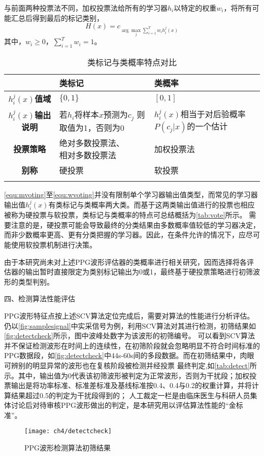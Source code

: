 与前面两种投票法不同，加权投票法给所有的学习器$h_i$以特定的权重$w_i$，将所有可能汇总后得到最后的标记类别，
\begin{equation}
    \label{equ:wvoting}
    H(x)=c_{\arg \max\limits_{j} \sum_{i=1}^T{w_ih_i^j(x)}}
\end{equation}
其中，$w_i\ge0$，$\sum_{i=1}^T{w_i=1}$。
\begin{table}[htbp]
    \centering
    \caption{\label{tab:vote}类标记与类概率特点对比}
    \begin{tabularx}{\linewidth}{c|X<{\centering}X<{\centering}}
        \Xhline{1pt} 
            &\textbf{类标记}&\textbf{类概率}\\
        \hline
        \textbf{$h_i^j(x)$值域}  &$\{0,1\}$    &$[0,1]$     \\
        \textbf{$h_i^j(x)$输出说明}&\tabincell{c}{若$h_i$将样本$x$预测为$c_j$\\则取值为1，否则为0}&\tabincell{c}{$h_i^j(x)$相当于对后验概率\\$P(c_j|x)$的一个估计}\\
        \textbf{投票策略}&\tabincell{c}{绝对多数投票法、\\相对多数投票法}&加权投票法\\
        \textbf{别称}    &硬投票 &软投票 \\
        \Xhline{1pt}
    \end{tabularx}
\end{table}

\autoref{equ:mvoting}至\autoref{equ:wvoting}并没有限制单个学习器输出值类型，而常见的学习器输出值$h_i^j(x)$有类标记与类概率两大类。而基于这两类输出值进行的投票也相应被称为硬投票与软投票，类标记与类概率的特点可总结概括为\autoref{tab:vote}所示。
需要注意的是，硬投票可能会导致最终的分类结果由多数概率值较低的学习器决定，而非少数概率更高、更有分类把握的学习器。因此，在条件允许的情况下，应尽可能使用软投票机制进行决策。

由于本研究尚未对上述PPG波形评估器的类概率进行相关研究，因而选择将各评估器的输出暂时直接限定为类别标记输出为0或1，最终基于硬投票策略进行初筛波形的类型判别。

四、检测算法性能评估

PPG波形特征点按上述SCV算法定位完成后，需要对算法的性能进行分析评估。仍以\autoref{fig:samplesignal}中实采信号为例，利用SCV算法对其进行检测，初筛结果如\autoref{fig:detectcheck}所示，图中波峰处数字为该波形的初筛编号。
可以看到SCV算法并不保证检测波形在时间上的连续性，在初筛阶段就会忽略明显不符合时间标准的PPG数据段，如\autoref{fig:detectcheck}中44s-60s间的多段数据。而在初筛结果中，肉眼可辨别的明显异常的波形也在复核阶段被检测并经投票
最终判定,如\autoref{tab:detect}所示。其中，输出值为0代表该初筛波形被判定为正常波形，否则为干扰段；加权投票输出是将功率标准、标准差标准及基线标准按0.4、0.4与0.2的权重计算，并将计算结果超过0.5的判定为干扰段得到的；
人工裁定一栏是由临床医生与科研人员集体讨论后对待审核PPG波形做出的判定，是本研究用以评估算法性能的“金标准”。
\begin{figure}[htbp]
    \centering
    \texttt{[image: ch4/detectcheck]}
    \caption{\label{fig:detectcheck}PPG波形检测算法初筛结果}
\end{figure}

